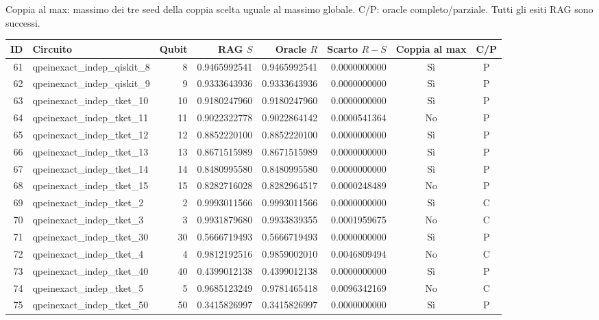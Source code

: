 \documentclass[10pt,a4paper,landscape]{article}
\begin{document}
\small Coppia al max: massimo dei tre seed della coppia scelta uguale al massimo globale.
C/P: oracle completo/parziale. Tutti gli esiti RAG sono successi.
\par\vspace{2mm}
{\fontsize{8.5}{10}\selectfont\setlength{\tabcolsep}{5pt}\renewcommand{\arraystretch}{1.18}

\begin{tabular}{rlrrrrcc}
\toprule
ID & Circuito & Qubit & RAG $S$ & Oracle $R$ & Scarto $R-S$ & Coppia al max & C/P \\
\midrule
61 & qpeinexact\_indep\_qiskit\_8 & 8 & 0.9465992541 & 0.9465992541 & 0.0000000000 & Sì & P \\
62 & qpeinexact\_indep\_qiskit\_9 & 9 & 0.9333643936 & 0.9333643936 & 0.0000000000 & Sì & P \\
63 & qpeinexact\_indep\_tket\_10 & 10 & 0.9180247960 & 0.9180247960 & 0.0000000000 & Sì & P \\
64 & qpeinexact\_indep\_tket\_11 & 11 & 0.9022322778 & 0.9022864142 & 0.0000541364 & No & P \\
65 & qpeinexact\_indep\_tket\_12 & 12 & 0.8852220100 & 0.8852220100 & 0.0000000000 & Sì & P \\
66 & qpeinexact\_indep\_tket\_13 & 13 & 0.8671515989 & 0.8671515989 & 0.0000000000 & Sì & P \\
67 & qpeinexact\_indep\_tket\_14 & 14 & 0.8480995580 & 0.8480995580 & 0.0000000000 & Sì & P \\
68 & qpeinexact\_indep\_tket\_15 & 15 & 0.8282716028 & 0.8282964517 & 0.0000248489 & No & P \\
69 & qpeinexact\_indep\_tket\_2 & 2 & 0.9993011566 & 0.9993011566 & 0.0000000000 & Sì & C \\
70 & qpeinexact\_indep\_tket\_3 & 3 & 0.9931879680 & 0.9933839355 & 0.0001959675 & No & C \\
71 & qpeinexact\_indep\_tket\_30 & 30 & 0.5666719493 & 0.5666719493 & 0.0000000000 & Sì & P \\
72 & qpeinexact\_indep\_tket\_4 & 4 & 0.9812192516 & 0.9859002010 & 0.0046809494 & No & C \\
73 & qpeinexact\_indep\_tket\_40 & 40 & 0.4399012138 & 0.4399012138 & 0.0000000000 & Sì & P \\
74 & qpeinexact\_indep\_tket\_5 & 5 & 0.9685123249 & 0.9781465418 & 0.0096342169 & No & C \\
75 & qpeinexact\_indep\_tket\_50 & 50 & 0.3415826997 & 0.3415826997 & 0.0000000000 & Sì & P \\

\end{tabular}}
\end{document}
